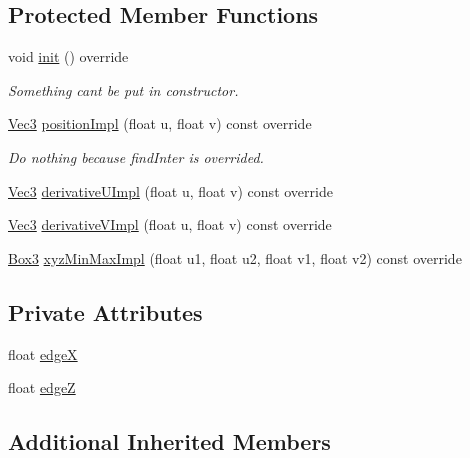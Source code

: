 \subsection*{Protected Member Functions}
\begin{DoxyCompactItemize}
\item 
void \hyperlink{classSquareZX_aefbaa1f1b673aa405f427dbacc81114c}{init} () override
\begin{DoxyCompactList}\small\item\em Something can\textquotesingle{}t be put in constructor. \end{DoxyCompactList}\item 
\hyperlink{vec_8h_ae4fcaa7c0a3935930ed1be5f70b90373}{Vec3} \hyperlink{classSquareZX_a505da0c732d570991b69837e9dac89e5}{position\+Impl} (float u, float v) const override
\begin{DoxyCompactList}\small\item\em Do nothing because find\+Inter is overrided. \end{DoxyCompactList}\item 
\hyperlink{vec_8h_ae4fcaa7c0a3935930ed1be5f70b90373}{Vec3} \hyperlink{classSquareZX_aafd9b0bfc12a6034d07d4cf27b211cfd}{derivative\+U\+Impl} (float u, float v) const override
\item 
\hyperlink{vec_8h_ae4fcaa7c0a3935930ed1be5f70b90373}{Vec3} \hyperlink{classSquareZX_a3ede3591078b049a8997ad144d7f92cd}{derivative\+V\+Impl} (float u, float v) const override
\item 
\hyperlink{structBox3}{Box3} \hyperlink{classSquareZX_a87b224b775e24f1d6ba984d37d0c85eb}{xyz\+Min\+Max\+Impl} (float u1, float u2, float v1, float v2) const override
\end{DoxyCompactItemize}
\subsection*{Private Attributes}
\begin{DoxyCompactItemize}
\item 
float \hyperlink{classSquareZX_a7e460f5cda678eb9c3860303395adc8e}{edgeX}
\item 
float \hyperlink{classSquareZX_a3f05799d20b98477ea21d7479ba32e16}{edgeZ}
\end{DoxyCompactItemize}
\subsection*{Additional Inherited Members}


